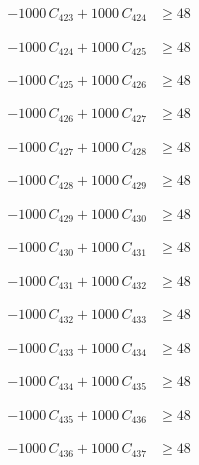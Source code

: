 \documentclass[a4paper,11pt]{article}
\begin{document}
\begin{align}
-1000\,C_{423} + 1000\,C_{424} &\geq 48 \nonumber
\end{align}

\begin{align}
-1000\,C_{424} + 1000\,C_{425} &\geq 48 \nonumber
\end{align}

\begin{align}
-1000\,C_{425} + 1000\,C_{426} &\geq 48 \nonumber
\end{align}

\begin{align}
-1000\,C_{426} + 1000\,C_{427} &\geq 48 \nonumber
\end{align}

\begin{align}
-1000\,C_{427} + 1000\,C_{428} &\geq 48 \nonumber
\end{align}

\begin{align}
-1000\,C_{428} + 1000\,C_{429} &\geq 48 \nonumber
\end{align}

\begin{align}
-1000\,C_{429} + 1000\,C_{430} &\geq 48 \nonumber
\end{align}

\begin{align}
-1000\,C_{430} + 1000\,C_{431} &\geq 48 \nonumber
\end{align}

\begin{align}
-1000\,C_{431} + 1000\,C_{432} &\geq 48 \nonumber
\end{align}

\begin{align}
-1000\,C_{432} + 1000\,C_{433} &\geq 48 \nonumber
\end{align}

\begin{align}
-1000\,C_{433} + 1000\,C_{434} &\geq 48 \nonumber
\end{align}

\begin{align}
-1000\,C_{434} + 1000\,C_{435} &\geq 48 \nonumber
\end{align}

\begin{align}
-1000\,C_{435} + 1000\,C_{436} &\geq 48 \nonumber
\end{align}

\begin{align}
-1000\,C_{436} + 1000\,C_{437} &\geq 48 \nonumber
\end{align}
\end{document}
